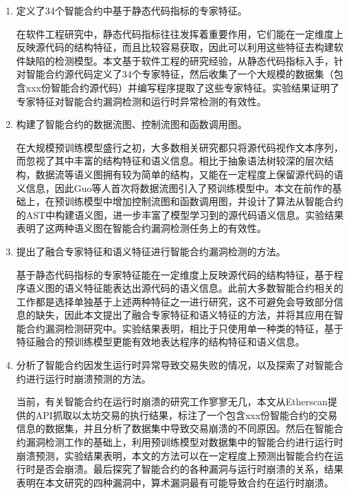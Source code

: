 \begin{enumerate}[label=(\arabic*)]
    \item 定义了34个智能合约中基于静态代码指标的专家特征。
    
    在软件工程研究中，静态代码指标往往发挥着重要作用，它们能在一定维度上反映源代码的结构特征，而且比较容易获取，因此可以利用这些特征去构建软件缺陷的检测模型。本文基于软件工程的研究经验，从静态代码指标入手，针对智能合约源代码定义了34个专家特征，然后收集了一个大规模的数据集（包含xxx份智能合约源代码）并编写程序提取了这些专家特征。实验结果证明了专家特征对智能合约漏洞检测和运行时异常检测的有效性。
    
    \item 构建了智能合约的数据流图、控制流图和函数调用图。
    
    在大规模预训练模型盛行之初，大多数相关研究都只将源代码视作文本序列，而忽视了其中丰富的结构特征和语义信息。相比于抽象语法树较深的层次结构，数据流等语义图拥有较为简单的结构，又能在一定程度上保留源代码的语义信息，因此Guo等人\cite{guo2020graphcodebert}首次将数据流图引入了预训练模型中。本文在前作的基础上，在预训练模型中增加控制流图和函数调用图，并设计了算法从智能合约的AST中构建语义图，进一步丰富了模型学习到的源代码语义信息。实验结果表明了这两种语义图在智能合约漏洞检测任务上的有效性。

    \item 提出了融合专家特征和语义特征进行智能合约漏洞检测的方法。
    
    基于静态代码指标的专家特征能在一定维度上反映源代码的结构特征，基于程序语义图的语义特征能表达出源代码的语义信息。此前大多数智能合约相关的工作都是选择单独基于上述两种特征之一进行研究，这不可避免会导致部分信息的缺失，因此本文提出了融合专家特征和语义特征的方法，并将其应用在智能合约漏洞检测研究中。实验结果表明，相比于只使用单一种类的特征，基于特征融合的预训练模型更能有效地表达程序的结构特征和语义信息。

    \item 分析了智能合约因发生运行时异常导致交易失败的情况，以及探索了对智能合约进行运行时崩溃预测的方法。

    当前，有关智能合约在运行时崩溃的研究工作寥寥无几，本文从Etherscan提供的API抓取以太坊交易的执行结果，标注了一个包含xxx份智能合约的交易信息的数据集，并且分析了数据集中导致交易崩溃的不同原因。然后在智能合约漏洞检测工作的基础上，利用预训练模型对数据集中的智能合约进行运行时崩溃预测，实验结果表明，本文的方法可以在一定程度上预测出智能合约在运行时是否会崩溃。最后探究了智能合约的各种漏洞与运行时崩溃的关系，结果表明在本文研究的四种漏洞中，算术漏洞最有可能导致合约在运行时崩溃。

\end{enumerate}
